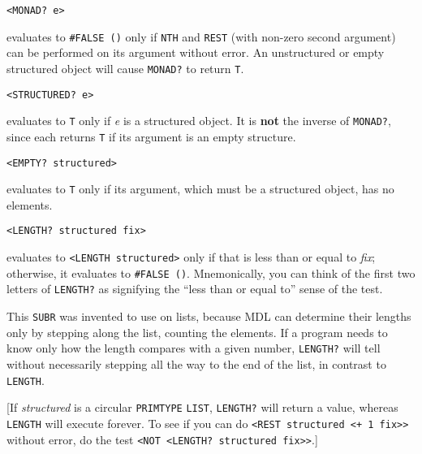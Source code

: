 \documentclass[a4paper]{scrbook}
\begin{document}
\begin{verbatim}
<MONAD? e>
\end{verbatim}

 evaluates to \texttt{\#FALSE\ ()} only if \texttt{NTH} and
\texttt{REST} (with non-zero second argument) can be performed on its argument without error. An
unstructured or empty structured object will cause \texttt{MONAD?} to return \texttt{T}.

\begin{verbatim}
<STRUCTURED? e>
\end{verbatim}

 evaluates to \texttt{T} only if \emph{e} is a structured object. It is \textbf{not} the
inverse of \texttt{MONAD?}, since each returns \texttt{T} if its argument is an empty structure.

\begin{verbatim}
<EMPTY? structured>
\end{verbatim}

 evaluates to \texttt{T} only if its argument, which must be a structured object, has no
elements.

\begin{verbatim}
<LENGTH? structured fix>
\end{verbatim}

 evaluates to \texttt{\textless{}LENGTH\ structured\textgreater{}}
only if that is less than or equal to \emph{fix}; otherwise, it evaluates to \texttt{\#FALSE\ ()}. Mnemonically, you can
think of the first two letters of \texttt{LENGTH?} as signifying the ``less than or equal to'' sense of the test.

This \texttt{SUBR} was invented to use on lists, because MDL can determine their lengths only by stepping along the list,
counting the elements. If a program needs to know only how the length compares with a given number, \texttt{LENGTH?} will
tell without necessarily stepping all the way to the end of the list, in contrast to \texttt{LENGTH}.

{[}If \emph{structured} is a circular \texttt{PRIMTYPE} \texttt{LIST}, \texttt{LENGTH?} will return a value, whereas
\texttt{LENGTH} will execute forever. To see if you can do
\texttt{\textless{}REST\ structured\ \textless{}+\ 1\ fix\textgreater{}\textgreater{}} without error, do the test
\texttt{\textless{}NOT\ \textless{}LENGTH?\ structured\ fix\textgreater{}\textgreater{}}.{]}
\end{document}
